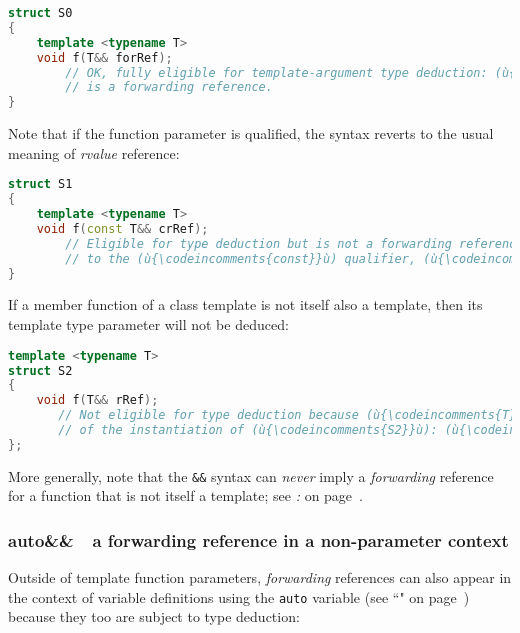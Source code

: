 \begin{lstlisting}[language=C++]
struct S0
{
    template <typename T>
    void f(T&& forRef);
        // OK, fully eligible for template-argument type deduction: (ù{\codeincomments{forRef}}ù)
        // is a forwarding reference.
}
\end{lstlisting}

\noindent Note that if the function parameter is qualified, the syntax reverts to
the usual meaning of \emph{rvalue} reference:

\begin{lstlisting}[language=C++]
struct S1
{
    template <typename T>
    void f(const T&& crRef);
        // Eligible for type deduction but is not a forwarding reference: due
        // to the (ù{\codeincomments{const}}ù) qualifier, (ù{\codeincomments{crRef}}ù) is an *rvalue* reference.
}
\end{lstlisting}

\noindent If a member function of a class template is not itself also a template,
then its template type parameter will not be deduced:

\begin{lstlisting}[language=C++]
template <typename T>
struct S2
{
    void f(T&& rRef);
       // Not eligible for type deduction because (ù{\codeincomments{T}}ù) is fixed and known as part
       // of the instantiation of (ù{\codeincomments{S2}}ù): (ù{\codeincomments{rRef}}ù) is an *rvalue* reference.
};
\end{lstlisting}

\noindent More generally, note that the \texttt{\&\&} syntax can \emph{never}
imply a \emph{forwarding} reference for a function that is not itself a
template; see \textit{:
} on page~\pageref{forwarding-references-look-just-like-rvalue-references}.

\subsubsection[{\tt auto\&\&} --- a forwarding reference in a non-parameter context]{{\SubsubsecCode auto\&\&}~{\subsubemdash}~a forwarding reference in a non-parameter context}\label{auto-a-forwarding-reference-in-a-non-parameter-context}

Outside of template function parameters, \emph{forwarding} references
can also appear in the context of variable definitions using the
\texttt{auto} variable (see ``" on page~\pageref{auto-feature}) because they too are subject to type
deduction:

